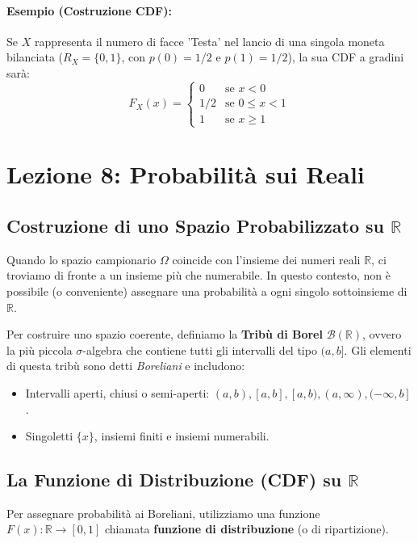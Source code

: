 \documentclass[12pt, a4paper]{article}
\begin{document}
\paragraph{Esempio (Costruzione CDF):} 
Se $X$ rappresenta il numero di facce 'Testa' nel lancio di una singola moneta bilanciata ($R_X = \{0, 1\}$, con $p(0)=1/2$ e $p(1)=1/2$), la sua CDF a gradini sarà:
$$
F_X(x) = 
\begin{cases} 
0 & \text{se } x < 0 \\
1/2 & \text{se } 0 \le x < 1 \\
1 & \text{se } x \ge 1
\end{cases}
$$


\section{Lezione 8: Probabilità sui Reali}

\subsection{Costruzione di uno Spazio Probabilizzato su \texorpdfstring{$\mathbb{R}$}{R}}
Quando lo spazio campionario $\Omega$ coincide con l'insieme dei numeri reali $\mathbb{R}$, ci troviamo di fronte a un insieme più che numerabile. In questo contesto, non è possibile (o conveniente) assegnare una probabilità a ogni singolo sottoinsieme di $\mathbb{R}$. 

Per costruire uno spazio coerente, definiamo la \textbf{Tribù di Borel} $\mathcal{B}(\mathbb{R})$, ovvero la più piccola $\sigma$-algebra che contiene tutti gli intervalli del tipo $(a, b]$. Gli elementi di questa tribù sono detti \textit{Boreliani} e includono:
\begin{itemize}
    \item Intervalli aperti, chiusi o semi-aperti: $(a,b), [a,b], [a,b), (a,\infty), (-\infty, b]$.
    \item Singoletti $\{x\}$, insiemi finiti e insiemi numerabili.
\end{itemize}

\subsection{La Funzione di Distribuzione (CDF) su \texorpdfstring{$\mathbb{R}$}{R}}
Per assegnare probabilità ai Boreliani, utilizziamo una funzione $F(x): \mathbb{R} \to [0, 1]$ chiamata \textbf{funzione di distribuzione} (o di ripartizione). 
\end{document}

